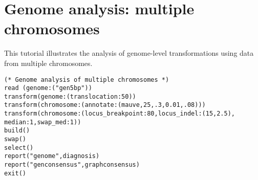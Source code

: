 \section{Genome analysis: multiple chromosomes}{\label{tutorial 9}}

This tutorial illustrates the analysis of genome-level transformations using data from multiple chromosomes. 

\begin{verbatim}
(* Genome analysis of multiple chromosomes *)
read (genome:("gen5bp"))
transform(genome:(translocation:50))
transform(chromosome:(annotate:(mauve,25,.3,0.01,.08)))
transform(chromosome:(locus_breakpoint:80,locus_indel:(15,2.5),
median:1,swap_med:1))
build()
swap()
select()
report("genome",diagnosis)
report("genconsensus",graphconsensus)
exit()
\end{verbatim}

